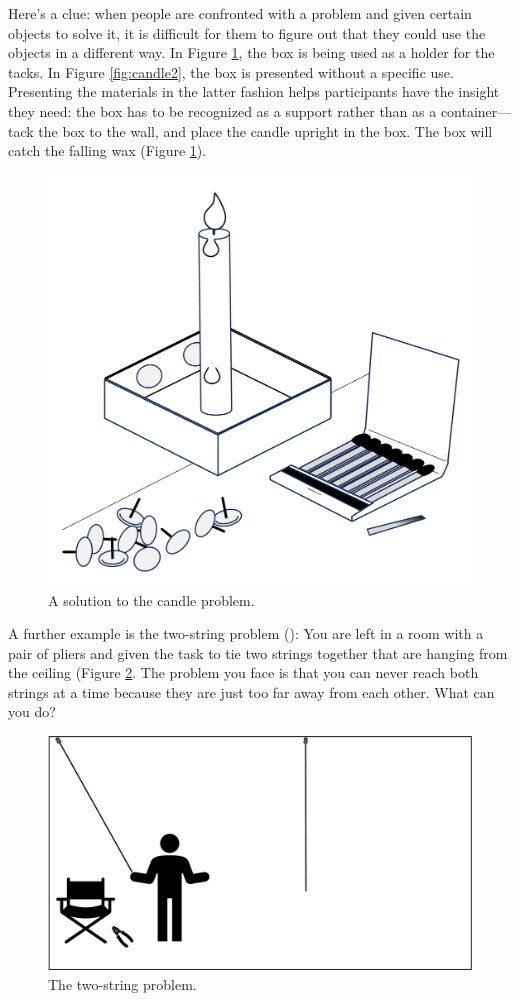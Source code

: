 \documentclass[
]{krantz}
\begin{document}
Here's a clue: when people are confronted with a problem and given certain objects to solve it, it is difficult for them to figure out that they could use the objects in a different way. In Figure \ref{fig:candle3}, the box is being used as a holder for the tacks. In Figure \ref{fig:candle2}, the box is presented without a specific use. Presenting the materials in the latter fashion helps participants have the insight they need: the box has to be recognized as a support rather than as a container--- tack the box to the wall, and place the candle upright in the box. The box will catch the falling wax (Figure \ref{fig:candle3}).

\begin{figure}

{\centering \includegraphics[width=0.45\linewidth]{images/ch10/candle3} 

}

\caption{A solution to the candle problem.}\label{fig:candle3}
\end{figure}

A further example is the two-string problem (): You are left in a room with a pair of pliers and given the task to tie two strings together that are hanging from the ceiling (Figure \ref{fig:twostring}. The problem you face is that you can never reach both strings at a time because they are just too far away from each other. What can you do?

\begin{figure}

{\centering \includegraphics[width=0.6\linewidth]{images/ch10/twostring} 

}

\caption{The two-string problem.}\label{fig:twostring}
\end{figure}
\end{document}
